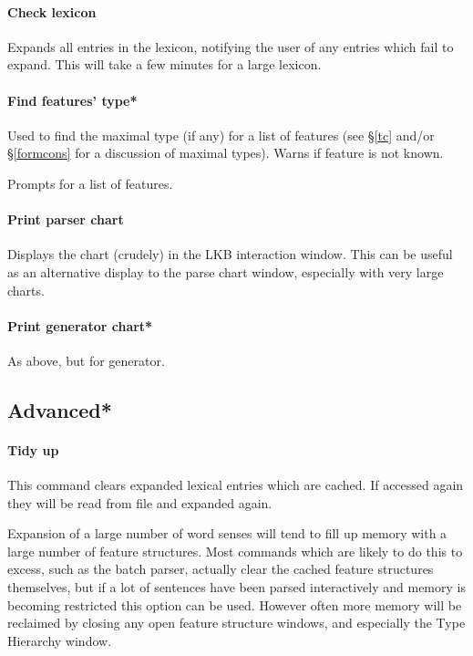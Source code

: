 \documentclass[12pt]{report}
\begin{document}
\paragraph{Check lexicon} Expands all entries in the lexicon,
notifying the user of any entries which fail to expand.
This will take a few minutes for a large lexicon.

\paragraph{Find features' type*}  Used to find the maximal type (if any)
for a list of features (see \S\ref{tc} and/or \S\ref{formcons} 
for a discussion of maximal types).
Warns if feature is not known.

Prompts for a list of features.

\paragraph{Print parser chart}
Displays the chart (crudely) in the LKB interaction
window.  This can be useful as an alternative display to
the parse chart window, especially with very large charts.

\paragraph{Print generator chart*}
As above, but for generator.

\subsection{Advanced*}

\paragraph{Tidy up}
\label{tidy}
This command clears expanded lexical entries which are cached.  
If accessed again they will be read
from file and expanded again.

Expansion of a large number of word senses will tend to fill up memory
with a large number of feature structures.  Most commands which are
likely to do this to excess, such as the batch parser,
actually clear the cached feature structures
themselves, but if a lot of sentences have been parsed interactively and
memory is becoming restricted this option can be
used.  However often more memory will be reclaimed by closing any open
feature structure windows, and especially the Type Hierarchy window.
\end{document}
